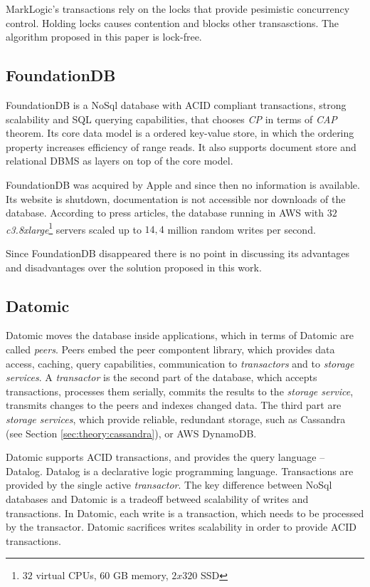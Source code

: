 MarkLogic's transactions rely on the locks that provide pesimistic concurrency control. Holding locks causes contention and blocks other transasctions. 
The algorithm proposed in this paper is lock-free.


\subsection{FoundationDB}
FoundationDB is a NoSql database with ACID compliant transactions, strong scalability and SQL querying capabilities, that chooses \emph{CP} in terms of \emph{CAP} theorem.
Its core data model is a ordered key-value store, in which the ordering property increases efficiency of range reads. It also supports document store and relational DBMS as layers on top of the core model. 

FoundationDB was acquired by Apple \cite{foundationDbAcquired} and since then no information is available. Its website is shutdown, documentation is not accessible nor downloads of the database. According to press articles, the database running in AWS with $32$ \emph{c3.8xlarge}\footnote{$32$ virtual CPUs, $60$ GB memory, $2x320$ SSD} servers scaled up to $14,4$ million random writes per second.

Since FoundationDB disappeared there is no point in discussing its advantages and disadvantages over the solution proposed in this work.

\subsection{Datomic}
Datomic \cite{datomic} moves the database inside applications, which in terms of Datomic are called \emph{peers}. Peers embed the peer compontent library, which provides data access, caching, query capabilities, communication to \emph{transactors} and to \emph{storage services}. A \emph{transactor} is the second part of the database, which accepts transactions, processes them serially, commits the results to the \emph{storage service}, transmits changes to the peers and indexes changed data. The third part are \emph{storage services}, which provide reliable, redundant storage, such as Cassandra (see Section \ref{sec:theory:cassandra}), or AWS DynamoDB.

Datomic supports ACID transactions, and provides the query language -- Datalog. Datalog is a declarative logic programming language. Transactions are provided by the single active \emph{transactor}. The key difference between NoSql databases and Datomic is a tradeoff betweed scalability of writes and transactions. In Datomic, each write is a transaction, which needs to be processed by the transactor. Datomic sacrifices writes scalability in order to provide ACID transactions.

